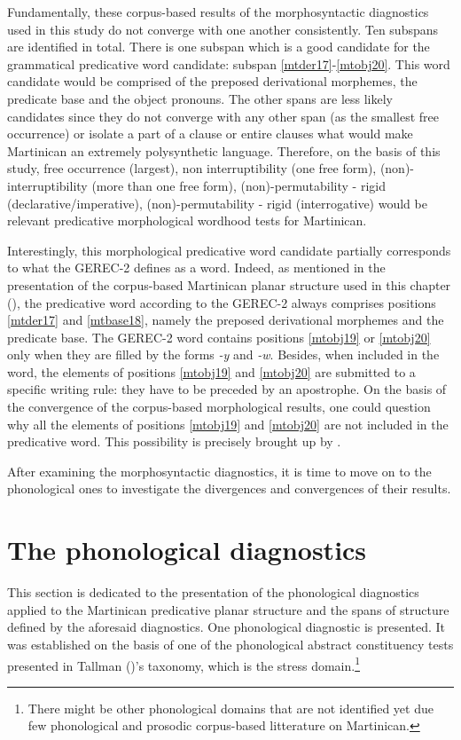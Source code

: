 \documentclass[output=paper]{langscibook}
\begin{document}
Fundamentally, these corpus-based results of the morphosyntactic diagnostics used in this study do not converge with one another consistently. Ten subspans are identified in total. There is one subspan which is a good candidate for the grammatical predicative word candidate: subspan \ref{mtder17}-\ref{mtobj20}. This word candidate would be comprised of the preposed derivational morphemes, the predicate base and the object pronouns. The other spans are less likely candidates since they do not converge with any other span (as the smallest free occurrence) or isolate a part of a clause or entire clauses what would make Martinican an extremely polysynthetic language. Therefore, on the basis of this study, free occurrence (largest), non interruptibility (one free form), (non)-interruptibility (more than one free form), (non)-permutability - rigid (declarative/imperative), (non)-permutability - rigid (interrogative) would be relevant predicative morphological wordhood tests for Martinican.

Interestingly, this morphological predicative word candidate partially corresponds to what the GEREC-2 defines as a word. Indeed, as mentioned in the presentation of the corpus-based Martinican planar structure used in this chapter (), the predicative word according to the GEREC-2 always comprises positions \ref{mtder17} and \ref{mtbase18}, namely the preposed derivational morphemes and the predicate base. The GEREC-2 word contains positions \ref{mtobj19} or \ref{mtobj20} only when they are filled by the forms \textit{{}-y} and \textit{{}-w}. Besides, when included in the word, the elements of positions \ref{mtobj19} and \ref{mtobj20} are submitted to a specific writing rule: they have to be preceded by an apostrophe. On the basis of the convergence of the corpus-based morphological results, one could question why all the elements of positions \ref{mtobj19} and \ref{mtobj20} are not included in the predicative word. This possibility is precisely brought up by \citet{Zribi-Hertz2017}.

After examining the morphosyntactic diagnostics, it is time to move on to the phonological ones to investigate the divergences and convergences of their results.

\section{The phonological diagnostics}
\label{bkm:Ref77669705}

This section is dedicated to the presentation of the phonological diagnostics applied to the Martinican predicative planar structure and the spans of structure defined by the aforesaid diagnostics. One phonological diagnostic is presented. It was established on the basis of one of the phonological abstract constituency tests presented in Tallman (\citeyear[16]{tallman2021constituency})'s taxonomy, which is the stress domain.\footnote{There might be other phonological domains that are not identified yet due few phonological and prosodic corpus-based litterature on Martinican.}
\end{document}

